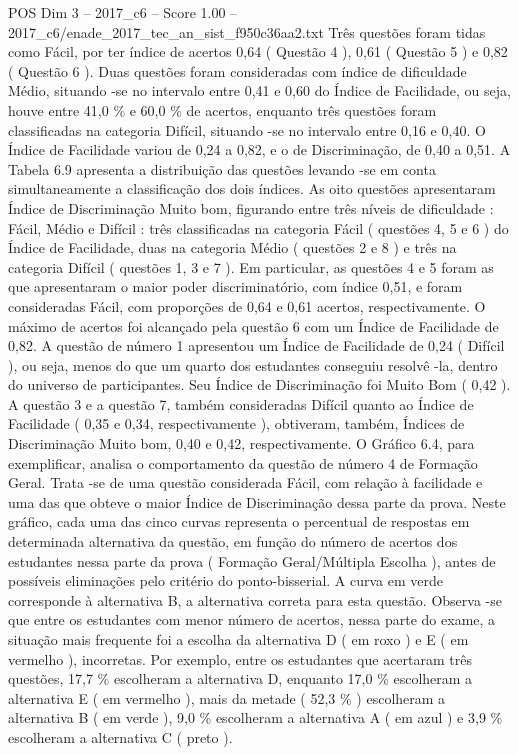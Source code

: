\begin{textsample}{POS Dim 3 – 2017\_c6 – Score 1.00 – 2017\_c6/enade\_2017\_tec\_an\_sist\_f950c36aa2.txt}
Três questões foram tidas como Fácil, por ter índice de acertos 0,64 ( Questão 4 ), 0,61 ( Questão 5 ) e 0,82 ( Questão 6 ).
Duas questões foram consideradas com índice de dificuldade Médio, situando -se no intervalo entre 0,41 e 0,60 do Índice de Facilidade, ou seja, houve entre 41,0 \% e 60,0 \% de acertos, enquanto três questões foram classificadas na categoria Difícil, situando -se no intervalo entre 0,16 e 0,40.
O Índice de Facilidade variou de 0,24 a 0,82, e o de Discriminação, de 0,40 a 0,51.
A Tabela 6.9 apresenta a distribuição das questões levando -se em conta simultaneamente a classificação dos dois índices.
As oito questões apresentaram Índice de Discriminação Muito bom, figurando entre três níveis de dificuldade : Fácil, Médio e Difícil : três classificadas na categoria Fácil ( questões 4, 5 e 6 ) do Índice de Facilidade, duas na categoria Médio ( questões 2 e 8 ) e três na categoria Difícil ( questões 1, 3 e 7 ).
Em particular, as questões 4 e 5 foram as que apresentaram o maior poder discriminatório, com índice 0,51, e foram consideradas Fácil, com proporções de 0,64 e 0,61 acertos, respectivamente.
O máximo de acertos foi alcançado pela questão 6 com um Índice de Facilidade de 0,82.
A questão de número 1 apresentou um Índice de Facilidade de 0,24 ( Difícil ), ou seja, menos do que um quarto dos estudantes conseguiu resolvê -la, dentro do universo de participantes.
Seu Índice de Discriminação foi Muito Bom ( 0,42 ).
A questão 3 e a questão 7, também consideradas Difícil quanto ao Índice de Facilidade ( 0,35 e 0,34, respectivamente ), obtiveram, também, Índices de Discriminação Muito bom, 0,40 e 0,42, respectivamente.
O Gráfico 6.4, para exemplificar, analisa o comportamento da questão de número 4 de Formação Geral.
Trata -se de uma questão considerada Fácil, com relação à facilidade e uma das que obteve o maior Índice de Discriminação dessa parte da prova.
Neste gráfico, cada uma das cinco curvas representa o percentual de respostas em determinada alternativa da questão, em função do número de acertos dos estudantes nessa parte da prova ( Formação Geral/Múltipla Escolha ), antes de possíveis eliminações pelo critério do ponto-bisserial.
A curva em verde corresponde à alternativa B, a alternativa correta para esta questão.
Observa -se que entre os estudantes com menor número de acertos, nessa parte do exame, a situação mais frequente foi a escolha da alternativa D ( em roxo ) e E ( em vermelho ), incorretas.
Por exemplo, entre os estudantes que acertaram três questões, 17,7 \% escolheram a alternativa D, enquanto 17,0 \% escolheram a alternativa E ( em vermelho ), mais da metade ( 52,3 \% ) escolheram a alternativa B ( em verde ), 9,0 \% escolheram a alternativa A ( em azul ) e 3,9 \% escolheram a alternativa C ( preto ).

\end{textsample}
